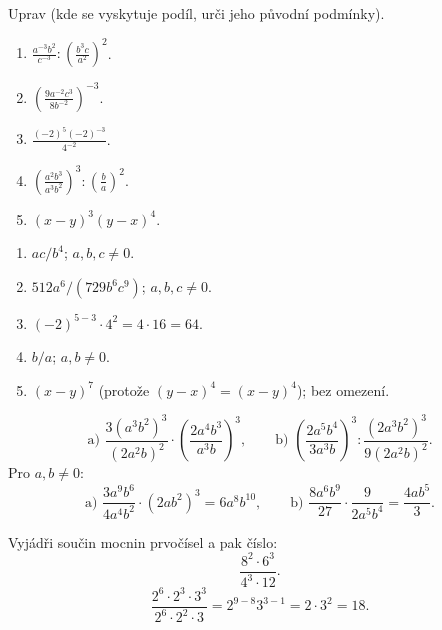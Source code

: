 \documentclass[11pt,a4paper]{article}
\begin{document}
\begin{zadaniReseniBox}[title={Samostatná práce 1},breakable=false]
Uprav (kde se vyskytuje podíl, urči jeho původní podmínky).
\begin{enumerate}[label=\alph*)]
\item $\displaystyle\frac{a^{-3}b^2}{c^{-3}}:\left(\frac{b^3c}{a^2}\right)^2$.
\item $\displaystyle\left(\frac{9a^{-2}c^3}{8b^{-2}}\right)^{-3}$.
\item $\displaystyle\frac{(-2)^5(-2)^{-3}}{4^{-2}}$.
\item $\displaystyle\left(\frac{a^2b^3}{a^3b^2}\right)^3:\left(\frac ba\right)^2$.
\item $(x-y)^3(y-x)^4$.
\end{enumerate}
\tcblower
\begin{enumerate}[label=\alph*)]
\item $\boxed{ac/b^4}$; $a,b,c\ne0$.
\item $\boxed{512a^6/(729b^6c^9)}$; $a,b,c\ne0$.
\item $(-2)^{5-3}\cdot4^2=4\cdot16=\boxed{64}$.
\item $\boxed{b/a}$; $a,b\ne0$.
\item $\boxed{(x-y)^7}$ (protože $(y-x)^4=(x-y)^4$); bez omezení.
\end{enumerate}
\end{zadaniReseniBox}

\begin{zadaniReseniBox}[title={Rozšíření 1},breakable=false]
\[
\text{a) }\frac{3(a^3b^2)^3}{(2a^2b)^2}
\cdot\left(\frac{2a^4b^3}{a^3b}\right)^3,
\qquad
\text{b) }\left(\frac{2a^5b^4}{3a^3b}\right)^3:
\frac{(2a^3b^2)^3}{9(2a^2b)^2}.
\]
\tcblower
Pro $a,b\ne0$:
\[
\text{a) }\frac{3a^9b^6}{4a^4b^2}\cdot(2ab^2)^3
=\boxed{6a^8b^{10}},\qquad
\text{b) }\frac{8a^6b^9}{27}\cdot\frac{9}{2a^5b^4}
=\boxed{\frac{4ab^5}{3}}.
\]
\end{zadaniReseniBox}

\begin{prikladReseniBox}[title={Příklad 2},breakable=false]
Vyjádři součin mocnin prvočísel a pak číslo:
\[
\frac{8^2\cdot6^3}{4^3\cdot12}.
\]
\tcblower
\[
\frac{2^6\cdot2^3\cdot3^3}{2^6\cdot2^2\cdot3}
=2^{9-8}3^{3-1}=2\cdot3^2=\boxed{18}.
\]
\end{prikladReseniBox}
\end{document}
